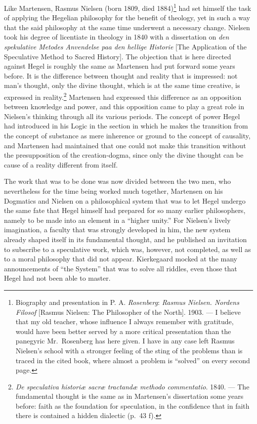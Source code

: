\documentclass[12pt,a4paper]{book}
\newcommand{\opage}[1]{\marginnote{\footnotesize\textit{[#1]}}}
\begin{document}
Like Martensen, Rasmus Nielsen (born 1809, died 1884)\footnote{Biography and presentation in
P. A. \emph{Rosenberg}: \emph{Rasmus Nielsen. Nordens Filosof} [Rasmus Nielsen: The Philosopher of
the North]. 1903. --- I believe that my old teacher, whose influence I always remember with
gratitude, would have been better served by a more critical presentation than the panegyric
Mr.\ Rosenberg has here given. I have in any case left Rasmus Nielsen's school with a
stronger feeling of the sting of the problems than is traced in the cited book, where almost
a problem is ``solved'' on every second page.} had set himself the task of applying the
Hegelian philosophy for the benefit of theology, yet in such a way that the said philosophy
at the same time underwent a necessary change. Nielsen took his degree of licentiate in
theology in 1840 with a dissertation on \emph{den spekulative Metodes Anvendelse paa den
hellige Historie} [The Application of the Speculative Method to Sacred History]. The
objection that is here directed against Hegel is roughly \opage{185}the same as Martensen had put
forward some years before. It is the difference between thought and reality that is
impressed: not man's thought, only the divine thought, which is at the same time creative, is
expressed in reality.\footnote{\emph{De speculativa historiæ sacræ tractandæ methodo
commentatio}. 1840. --- The fundamental thought is the same as in Martensen's dissertation
some years before: faith as the foundation for speculation, in the confidence that in faith
there is contained a hidden dialectic (p.~43 f).} Martensen had expressed this difference as
an opposition between knowledge and power, and this opposition came to play a great role in
Nielsen's thinking through all its various periods. The concept of power Hegel had introduced
in his Logic in the section in which he makes the transition from the concept of substance as
mere inherence or ground to the concept of causality, and Martensen had maintained that one
could not make this transition without the presupposition of the creation-dogma, since only
the divine thought can be cause of a reality different from itself.

The work that was to be done was now divided between the two men, who nevertheless for the
time being worked much together, Martensen on his Dogmatics and Nielsen on a philosophical
system that was to let Hegel undergo the same fate that Hegel himself had prepared for so many
earlier philosophers, namely to be made into an element in a ``higher unity.'' For Nielsen's
lively imagination, a faculty that was strongly developed in him, the new system already
shaped itself in its fundamental thought, and he published an invitation to subscribe to a
speculative work, which was, however, not completed, as well as to a moral philosophy that did
not appear. Kierkegaard mocked at the many announcements of ``the System'' that was to solve
all riddles, even those that Hegel had not been able to master.
\end{document}
